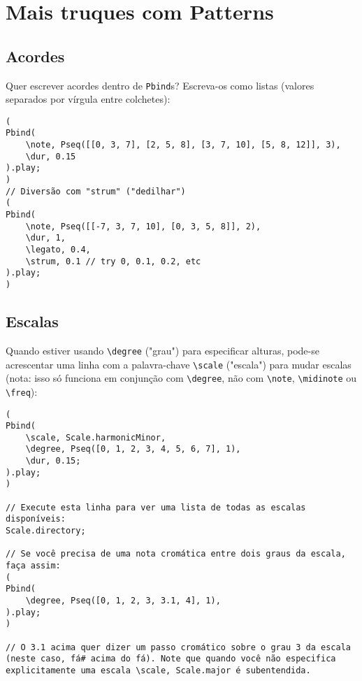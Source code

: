 \section{Mais truques com Patterns}

\subsection{Acordes}

Quer escrever acordes dentro de \texttt{Pbind}s? Escreva-os como listas (valores separados por vírgula entre colchetes):
 
\begin{lstlisting}[style=SuperCollider-IDE, basicstyle=\scttfamily\footnotesize]
(
Pbind(
	\note, Pseq([[0, 3, 7], [2, 5, 8], [3, 7, 10], [5, 8, 12]], 3),
	\dur, 0.15
).play;
)
// Diversão com "strum" ("dedilhar")
(
Pbind(
	\note, Pseq([[-7, 3, 7, 10], [0, 3, 5, 8]], 2),
	\dur, 1,
	\legato, 0.4,
	\strum, 0.1 // try 0, 0.1, 0.2, etc
).play;
)
\end{lstlisting}
 

\subsection{Escalas}

Quando estiver usando \texttt{\textbackslash degree} ("grau") para especificar alturas, pode-se acrescentar uma linha com a palavra-chave \texttt{\textbackslash scale} ("escala") para mudar escalas (nota: isso só funciona em conjunção com \texttt{\textbackslash degree}, não com \texttt{\textbackslash note}, \texttt{\textbackslash midinote} ou \texttt{\textbackslash freq}):

 
\begin{lstlisting}[style=SuperCollider-IDE, basicstyle=\scttfamily\footnotesize]
(
Pbind(
	\scale, Scale.harmonicMinor,
	\degree, Pseq([0, 1, 2, 3, 4, 5, 6, 7], 1),
	\dur, 0.15;
).play;
)

// Execute esta linha para ver uma lista de todas as escalas disponíveis:
Scale.directory;

// Se você precisa de uma nota cromática entre dois graus da escala, faça assim:
(
Pbind(
	\degree, Pseq([0, 1, 2, 3, 3.1, 4], 1),
).play;
)

// O 3.1 acima quer dizer um passo cromático sobre o grau 3 da escala (neste caso, fá# acima do fá). Note que quando você não especifica explicitamente uma escala \scale, Scale.major é subentendida.
\end{lstlisting}


